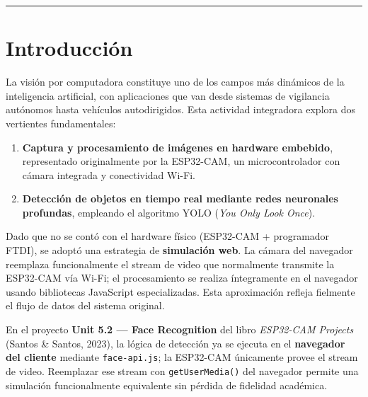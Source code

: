 \documentclass[12pt,a4paper]{article}
\begin{document}
\begin{titlepage}
  \vspace{0.8cm}
  {\color{tenam-cyan}\rule{\linewidth}{2pt}}
\end{titlepage}
\pagecolor{white}
\color{black}

\tableofcontents
\newpage

\section{Introducción}

La visión por computadora constituye uno de los campos más dinámicos de la inteligencia artificial, con aplicaciones que van desde sistemas de vigilancia autónomos hasta vehículos autodirigidos. Esta actividad integradora explora dos vertientes fundamentales:

\begin{enumerate}[leftmargin=*, itemsep=4pt]
  \item \textbf{Captura y procesamiento de imágenes en hardware embebido}, representado originalmente por la ESP32-CAM, un microcontrolador con cámara integrada y conectividad Wi-Fi.
  \item \textbf{Detección de objetos en tiempo real mediante redes neuronales profundas}, empleando el algoritmo YOLO (\textit{You Only Look Once}).
\end{enumerate}

Dado que no se contó con el hardware físico (ESP32-CAM + programador FTDI), se adoptó una estrategia de \textbf{simulación web}. La cámara del navegador reemplaza funcionalmente el stream de video que normalmente transmite la ESP32-CAM vía Wi-Fi; el procesamiento se realiza íntegramente en el navegador usando bibliotecas JavaScript especializadas. Esta aproximación refleja fielmente el flujo de datos del sistema original.

\begin{tcolorbox}[infobox, title={\faLightbulb\ Justificación de la Adaptación Web}]
  En el proyecto \textbf{Unit 5.2 — Face Recognition} del libro \textit{ESP32-CAM Projects} (Santos \& Santos, 2023), la lógica de detección ya se ejecuta en el \textbf{navegador del cliente} mediante \texttt{face-api.js}; la ESP32-CAM únicamente provee el stream de video. Reemplazar ese stream con \texttt{getUserMedia()} del navegador permite una simulación funcionalmente equivalente sin pérdida de fidelidad académica.
\end{tcolorbox}
\end{document}
